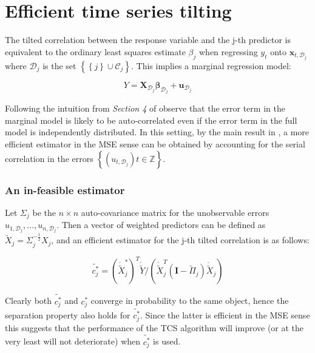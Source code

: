 \documentclass[11pt]{report}\usepackage[utf8]{inputenc}
\begin{document}
\section{Efficient time series tilting}\label{efficient tilting}

The tilted correlation between the response variable and the j-th predictor is equivalent to the ordinary least squares estimate $\beta_{j}$ when regressing $y_t$ onto $\boldsymbol{x}_{t,\mathcal{D}_j}$ where $\mathcal{D}_j$ is the set $\left \{ \left \{ j \right \} \cup \mathcal{C}_j \right \}$. This implies a marginal regression model: 

\begin{equation*} \label{marginal model}
    Y = \mathbf{X}_{\mathcal{D}_j} \boldsymbol{\beta}_{\mathcal{D}_j} + \boldsymbol{u}_{\mathcal{D}_j}
\end{equation*}

Following the intuition from \textit{Section 4} of \cite{yousuf2018variable} observe that the error term in the marginal model is likely to be auto-correlated even if the error term in the full model is independently distributed. In this setting, by the main result in \cite{aitkin1935least}, a more efficient estimator in the MSE sense can be obtained by accounting for the serial correlation in the errors $\left \{ \left ( u_{t,\mathcal{D}_j} \right ) t \in \mathbb{Z} \right \}$.

\subsubsection{An in-feasible estimator}

Let $\Sigma_j$ be the $n \times n$ auto-covariance matrix for the unobservable errors $u_{1,\mathcal{D}_j},...,u_{n,\mathcal{D}_j}$. Then a vector of weighted predictors can be defined as $\widetilde{X}_j = \Sigma_j^{-\frac{1}{2}} X_j$, and an efficient estimator for the j-th tilted correlation is as follows: 

\begin{equation*}
    \widetilde{c_j^*}= \left ( \mathring{\widetilde{X}}_j^* \right )^T \mathring{\widetilde{Y}} / \left ( \mathring{\widetilde{X}}_j^T \left ( \mathbf{I} - \widetilde{\Pi}_j \right ) \mathring{\widetilde{X}}_j \right )
\end{equation*}

Clearly both $\widetilde{c_j^*}$ and $c_j^*$ converge in probability to the same object, hence the separation property also holds for $\widetilde{c_j^*}$. Since the latter is efficient in the MSE sense this suggests that the performance of the TCS algorithm will improve (or at the very least will not deteriorate) when $\widetilde{c_j^*}$ is used. 
\end{document}
